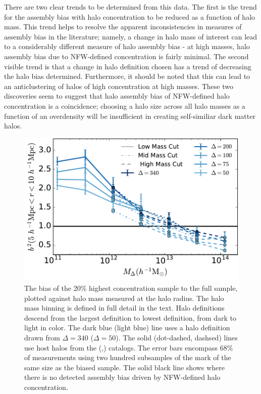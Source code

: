 \documentclass[usenatbib,fleqn]{mnras}
\begin{document}
There are two clear trends to be determined from this data. The first is the trend for the assembly bias with
halo concentration to be reduced as a function of halo mass. This trend helps to resolve the apparent
inconsistencies in measures of assembly bias in the literature; namely, a change in halo mass of
interest can lead to a considerably different measure of halo assembly bias - at high masses, halo assembly
bias due to NFW-defined concentration is fairly minimal. The second visible trend is that a change in halo
definition chosen has a trend of decreasing the halo bias determined. Furthermore, it should be noted that this
can lead to an anticlustering of halos of high concentration at high masses. These two discoveries seem to
suggest that halo assembly bias of NFW-defined halo concentration is a coincidence; choosing a halo size
across all halo masses as a function of an overdensity will be insufficient in creating self-similiar dark
matter halos.

\begin{figure}
	\centering
	\includegraphics[width=.8\textwidth]{biasplot.pdf}
	\caption{
	The bias of the 20\% highest concentration sample to the full sample, plotted against halo mass measured at the halo radius. The halo mass binning is defined in full detail in the text. Halo definitions descend from the largest definition to lowest definition, from dark to light in color. The dark blue (light blue) line uses a halo definition drawn from $\Delta = 340$ ($\Delta = 50$). The solid (dot-dashed, dashsed) lines use host halos from the \simA (\simB,\simC) catalogs. The
	error bars encompass 68\% of measurements using two hundred subsamples
	of the mark of the same size as the biased sample. The solid black line
	shows where there is no detected assembly bias driven by NFW-defined halo concentration.}
	\label{fig:biascompare}
\end{figure}
\end{document}
